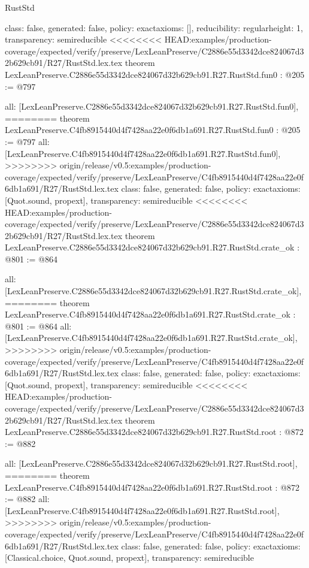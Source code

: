 \begin{lexlean}{RustStd}
\begin{coremodule}
{\begin{coremodule}
{{{  class: false,
  generated: false,
  policy: exact{axioms: []},
  reducibility: regular{height: 1},
  transparency: semireducible
}
<<<<<<<< HEAD:examples/production-coverage/expected/verify/preserve/LexLeanPreserve/C2886e55d3342dce824067d32b629cb91/R27/RustStd.lex.tex
theorem LexLeanPreserve.C2886e55d3342dce824067d32b629cb91.R27.RustStd.fun0 : @205 := @797 {
  all: [LexLeanPreserve.C2886e55d3342dce824067d32b629cb91.R27.RustStd.fun0],
========
theorem LexLeanPreserve.C4fb8915440d4f7428aa22e0f6db1a691.R27.RustStd.fun0 : @205 := @797 {
  all: [LexLeanPreserve.C4fb8915440d4f7428aa22e0f6db1a691.R27.RustStd.fun0],
>>>>>>>> origin/release/v0.5:examples/production-coverage/expected/verify/preserve/LexLeanPreserve/C4fb8915440d4f7428aa22e0f6db1a691/R27/RustStd.lex.tex
  class: false,
  generated: false,
  policy: exact{axioms: [Quot.sound, propext]},
  transparency: semireducible
}
<<<<<<<< HEAD:examples/production-coverage/expected/verify/preserve/LexLeanPreserve/C2886e55d3342dce824067d32b629cb91/R27/RustStd.lex.tex
theorem LexLeanPreserve.C2886e55d3342dce824067d32b629cb91.R27.RustStd.crate_ok : @801 := @864 {
  all: [LexLeanPreserve.C2886e55d3342dce824067d32b629cb91.R27.RustStd.crate_ok],
========
theorem LexLeanPreserve.C4fb8915440d4f7428aa22e0f6db1a691.R27.RustStd.crate_ok : @801 := @864 {
  all: [LexLeanPreserve.C4fb8915440d4f7428aa22e0f6db1a691.R27.RustStd.crate_ok],
>>>>>>>> origin/release/v0.5:examples/production-coverage/expected/verify/preserve/LexLeanPreserve/C4fb8915440d4f7428aa22e0f6db1a691/R27/RustStd.lex.tex
  class: false,
  generated: false,
  policy: exact{axioms: [Quot.sound, propext]},
  transparency: semireducible
}
<<<<<<<< HEAD:examples/production-coverage/expected/verify/preserve/LexLeanPreserve/C2886e55d3342dce824067d32b629cb91/R27/RustStd.lex.tex
theorem LexLeanPreserve.C2886e55d3342dce824067d32b629cb91.R27.RustStd.root : @872 := @882 {
  all: [LexLeanPreserve.C2886e55d3342dce824067d32b629cb91.R27.RustStd.root],
========
theorem LexLeanPreserve.C4fb8915440d4f7428aa22e0f6db1a691.R27.RustStd.root : @872 := @882 {
  all: [LexLeanPreserve.C4fb8915440d4f7428aa22e0f6db1a691.R27.RustStd.root],
>>>>>>>> origin/release/v0.5:examples/production-coverage/expected/verify/preserve/LexLeanPreserve/C4fb8915440d4f7428aa22e0f6db1a691/R27/RustStd.lex.tex
  class: false,
  generated: false,
  policy: exact{axioms: [Classical.choice, Quot.sound, propext]},
  transparency: semireducible
}

}}}}}
\end{coremodule}}
\end{coremodule}
\end{lexlean}
